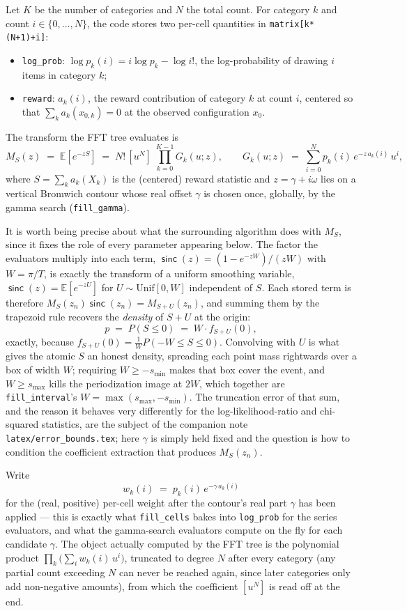\documentclass[11pt]{article}
\newcommand{\sinck}{\operatorname{\mathsf{sinc}}}
\begin{document}
Let $K$ be the number of categories and $N$ the total count. For category $k$ and
count $i \in \{0,\dots,N\}$, the code stores two per-cell quantities in
\texttt{matrix[k*(N+1)+i]}:
\begin{itemize}
  \item \texttt{log\_prob}: $\log p_k(i) = i\log p_k - \log i!$, the log-probability of
        drawing $i$ items in category $k$;
  \item \texttt{reward}: $a_k(i)$, the reward contribution of category $k$ at count
        $i$, centered so that $\sum_k a_k(x_{0,k}) = 0$ at the observed configuration
        $x_0$.
\end{itemize}
The transform the FFT tree evaluates is
\[
  M_S(z) \;=\; \mathbb E\!\left[e^{-zS}\right] \;=\; N!\,[u^N]\; \prod_{k=0}^{K-1} G_k(u; z),
  \qquad
  G_k(u;z) \;=\; \sum_{i=0}^{N} p_k(i)\, e^{-z\,a_k(i)}\, u^{i},
\]
where $S = \sum_k a_k(X_k)$ is the (centered) reward statistic and $z = \gamma + i\omega$
lies on a vertical Bromwich contour whose real offset $\gamma$ is chosen once, globally, by
the gamma search (\texttt{fill\_gamma}).

It is worth being precise about what the surrounding algorithm does with $M_S$, since it
fixes the role of every parameter appearing below. The factor the evaluators multiply into
each term, $\sinck(z) = (1-e^{-zW})/(zW)$ with $W = \pi/T$, is exactly the transform of a
uniform smoothing variable, $\sinck(z) = \mathbb E[e^{-zU}]$ for $U \sim \mathrm{Unif}[0,W]$
independent of $S$. Each stored term is therefore $M_S(z_n)\sinck(z_n) = M_{S+U}(z_n)$, and
summing them by the trapezoid rule recovers the \emph{density} of $S+U$ at the origin:
\[
  p \;=\; P(S \le 0) \;=\; W \cdot f_{S+U}(0),
\]
exactly, because $f_{S+U}(0) = \frac1W P(-W \le S \le 0)$. Convolving with $U$ is what gives
the atomic $S$ an honest density, spreading each point mass rightwards over a box of width
$W$; requiring $W \ge -s_{\min}$ makes that box cover the event, and $W \ge s_{\max}$ kills
the periodization image at $2W$, which together are \texttt{fill\_interval}'s
$W = \max(s_{\max}, -s_{\min})$. The truncation error of that sum, and the reason it behaves
very differently for the log-likelihood-ratio and chi-squared statistics, are the subject of
the companion note \texttt{latex/error\_bounds.tex}; here $\gamma$ is simply held fixed and
the question is how to condition the coefficient extraction that produces $M_S(z_n)$.

Write
\[
  w_k(i) \;=\; p_k(i)\, e^{-\gamma\, a_k(i)}
\]
for the (real, positive) per-cell weight after the contour's real part $\gamma$ has been
applied --- this is exactly what \texttt{fill\_cells} bakes into \texttt{log\_prob} for
the series evaluators, and what the gamma-search evaluators compute on the fly for each
candidate $\gamma$. The object actually computed by the FFT tree is the polynomial
product $\prod_k \big(\sum_i w_k(i)\,u^i\big)$, truncated to degree $N$ after every
category (any partial count exceeding $N$ can never be reached again, since later
categories only add non-negative amounts), from which the coefficient $[u^N]$ is read
off at the end.
\end{document}
